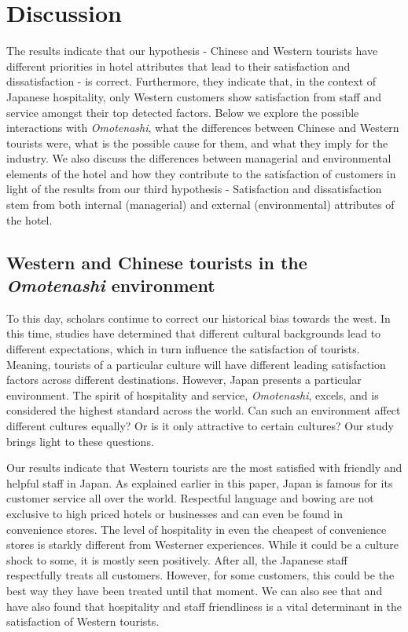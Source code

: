\documentclass[smallextended,natbib]{svjour3}       %
\begin{document}
\section{Discussion}\label{discussion}

The results indicate that our hypothesis - Chinese and Western tourists have different priorities in hotel attributes that lead to their satisfaction and dissatisfaction - is correct. Furthermore, they indicate that, in the context of Japanese hospitality, only Western customers show satisfaction from staff and service amongst their top detected factors. Below we explore the possible interactions with \textit{Omotenashi}, what the differences between Chinese and Western tourists were, what is the possible cause for them, and what they imply for the industry. We also discuss the differences between managerial and environmental elements of the hotel and how they contribute to the satisfaction of customers in light of the results from our third hypothesis - Satisfaction and dissatisfaction stem from both internal (managerial) and external (environmental) attributes of the hotel.

\subsection{Western and Chinese tourists in the \textit{Omotenashi} environment}\label{disc:omotenashi}

To this day, scholars continue to correct our historical bias towards the west. In this time, studies have determined that different cultural backgrounds lead to different expectations, which in turn influence the satisfaction of tourists. Meaning, tourists of a particular culture will have different leading satisfaction factors across different destinations. However, Japan presents a particular environment. The spirit of hospitality and service, \textit{Omotenashi}, excels, and is considered the highest standard across the world. Can such an environment affect different cultures equally? Or is it only attractive to certain cultures? Our study brings light to these questions. 

Our results indicate that Western tourists are the most satisfied with friendly and helpful staff in Japan. As explained earlier in this paper, Japan is famous for its customer service all over the world. Respectful language and bowing are not exclusive to high priced hotels or businesses and can even be found in convenience stores. The level of hospitality in even the cheapest of convenience stores is starkly different from Westerner experiences. While it could be a culture shock to some, it is mostly seen positively. After all, the Japanese staff respectfully treats all customers. However, for some customers, this could be the best way they have been treated until that moment. We can also see that \cite{kozak2002} and \cite{shanka2004} have also found that hospitality and staff friendliness is a vital determinant in the satisfaction of Western tourists. 
\end{document}
